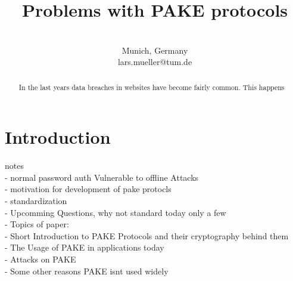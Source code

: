 \documentclass[journal]{IEEEtran}
\begin{document}
\title{Problems with PAKE protocols\\
}

\author{
 \\
Munich, Germany \\
lars.mueller@tum.de}

\maketitle

\begin{abstract}
In the last years data breaches in websites have become fairly common.
This happens 
\end{abstract}

\begin{IEEEkeywords}
\end{IEEEkeywords}

\section{Introduction}
notes \\
- normal password auth Vulnerable to offline Attacks \\
- motivation for development of pake protocls \\
- standardization  \\
- Upcomming Questions, why not standard today only a few  \\
- Topics of paper: \\
    - Short Introduction to PAKE Protocols and their cryptography behind them \\
    - The Usage of PAKE in applications today \\
    - Attacks on PAKE \\
    - Some other reasons PAKE isnt used widely \\
\end{document}
